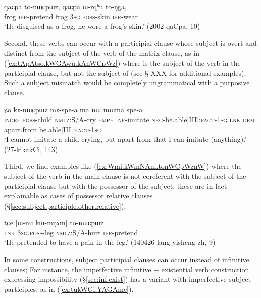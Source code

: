 \begin{exe}
\ex \label{ex:qaɕpa.tonWCpWz}
 \gll  qaɕpa to-nɯɕpɯz, qaɕpa ɯ-rqʰu to-ŋga, \\
frog \textsc{ifr}-pretend frog \textsc{3sg}.\textsc{poss}-skin \textsc{ifr}-wear \\
\glt `He disguised as a frog, he wore a frog's skin.' (2002 qaCpa, 10)
\end{exe}
 
 Second, these verbs can occur with a participial clause whose subject is overt and distinct from the subject of the verb of the matrix clause, as in (\ref{ex:tApAtso.kWGAwu.kAnWCpWz}) where   is the subject of the verb  in the participial clause, but not the subject of   (see § XXX for additional examples). Such a subject mismatch would be completely ungrammatical with a purposive clause.
 
\begin{exe}
\ex \label{ex:tApAtso.kWGAwu.kAnWCpWz}
  ʑo kɤ-nɯɕpɯz mɤ-spe-a ma nɯ mɯma spe-a \\
 \textsc{indef}.\textsc{poss}-child \textsc{nmlz}:S/A-cry \textsc{emph} \textsc{inf}-imitate \textsc{neg}-be.able[III]:\textsc{fact}-\textsc{1sg} \textsc{lnk} \textsc{dem} apart.from be.able[III]:\textsc{fact}-\textsc{1sg} \\
\glt `I cannot imitate a child crying, but apart from that I can imitate (anything).' (27-kikakCi, 143)
\end{exe}

Third, we find examples like (\ref{ex:Wmi.kWmNAm.tonWCpWznW}) where the subject of the verb in the main clause is not coreferent with the subject of the participial clause but with the possessor of the subject; these are in fact explainable as cases of possessor relative clauses (§\ref{sec:subject.participle.other.relative}).

\begin{exe}
\ex \label{ex:Wmi.kWmNAm.tonWCpWznW}
 \gll  tɕe [ɯ-mi kɯ-mŋɤm] to-nɯɕpɯz  \\
 \textsc{lnk} \textsc{3sg}.\textsc{poss}-leg \textsc{nmlz}:S/A-hurt \textsc{ifr}-pretend \\
 \glt `He pretended to have a pain in the leg.' (140426 lang yisheng-zh, 9)
\end{exe}

In some constructions, subject participial clauses can occur instead of infinitive clauses; For instance, the imperfective  infinitive + existential verb construction expressing impossibility (§\ref{sec:inf.exist}) has a variant with imperfective subject participles, as in (\ref{ex:tukWGi.YAGAme}). 

